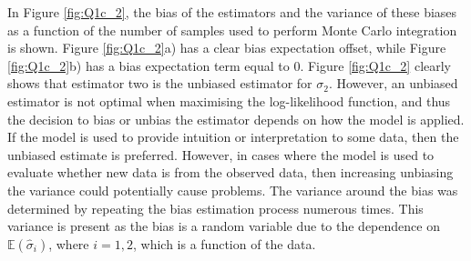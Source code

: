 \documentclass{article}
\begin{document}
 In Figure \ref{fig:Q1c_2}, the bias of the estimators and the variance of these biases as a function of the number of samples used to perform Monte Carlo integration is shown. Figure \ref{fig:Q1c_2}a) has a clear bias expectation offset, while Figure \ref{fig:Q1c_2}b) has a bias expectation term equal to 0. Figure \ref{fig:Q1c_2} clearly shows that estimator two is the unbiased estimator for $\sigma_2$. However, an unbiased estimator is not optimal when maximising the log-likelihood function, and thus the decision to bias or unbias the estimator depends on how the model is applied. If the model is used to provide intuition or interpretation to some data, then the unbiased estimate is preferred. However, in cases where the model is used to evaluate whether new data is from the observed data, then increasing unbiasing the variance could potentially cause problems. The variance around the bias was determined by repeating the bias estimation process numerous times. This variance is present as the bias is a random variable due to the dependence on $\mathbb{E}\left(\hat{\sigma}_{i}\right)$, where $i = 1, 2$, which is a function of the data.
\end{document}
